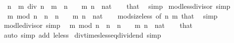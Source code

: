 \begin{isabellebody}
\ \ {\isachardoublequoteopen}n\ {\isacharasterisk}{\kern0pt}\ m\ div\ n\ {\isacharequal}{\kern0pt}\ m{\isachardoublequoteclose}\ \ {\isachardoublequoteopen}n\ {\isachargreater}{\kern0pt}\ {}{\isachardoublequoteclose}\ \ m\ n\ {\isacharcolon}{\kern0pt}{\isacharcolon}{\kern0pt}\ nat\isanewline
%
\isadelimproof
\ \ %
\endisadelimproof
%
\isatagproof
{}\isamarkupfalse%
\ that\ \isamarkupfalse%
\ simp%
\endisatagproof
{\isafoldproof}%
%
\isadelimproof
\isanewline
%
\endisadelimproof
\isanewline
{}\isamarkupfalse%
\ mod{\isacharunderscore}{\kern0pt}less{\isacharunderscore}{\kern0pt}divisor\ {\isacharbrackleft}{\kern0pt}simp{\isacharbrackright}{\kern0pt}{\isacharcolon}{\kern0pt}\isanewline
\ \ {\isachardoublequoteopen}m\ mod\ n\ {\isacharless}{\kern0pt}\ n{\isachardoublequoteclose}\ \ {\isachardoublequoteopen}n\ {\isachargreater}{\kern0pt}\ {}{\isachardoublequoteclose}\ \ m\ n\ {\isacharcolon}{\kern0pt}{\isacharcolon}{\kern0pt}\ nat\isanewline
%
\isadelimproof
\ \ %
\endisadelimproof
%
\isatagproof
{}\isamarkupfalse%
\ mod{\isacharunderscore}{\kern0pt}size{\isacharunderscore}{\kern0pt}less\ {\isacharbrackleft}{\kern0pt}of\ n\ m{\isacharbrackright}{\kern0pt}\ that\ \isamarkupfalse%
\ simp%
\endisatagproof
{\isafoldproof}%
%
\isadelimproof
\isanewline
%
\endisadelimproof
\isanewline
{}\isamarkupfalse%
\ mod{\isacharunderscore}{\kern0pt}le{\isacharunderscore}{\kern0pt}divisor\ {\isacharbrackleft}{\kern0pt}simp{\isacharbrackright}{\kern0pt}{\isacharcolon}{\kern0pt}\isanewline
\ \ {\isachardoublequoteopen}m\ mod\ n\ {\isasymle}\ n{\isachardoublequoteclose}\ \ {\isachardoublequoteopen}n\ {\isachargreater}{\kern0pt}\ {}{\isachardoublequoteclose}\ \ m\ n\ {\isacharcolon}{\kern0pt}{\isacharcolon}{\kern0pt}\ nat\isanewline
%
\isadelimproof
\ \ %
\endisadelimproof
%
\isatagproof
{}\isamarkupfalse%
\ that\ \isamarkupfalse%
\ {\isacharparenleft}{\kern0pt}auto\ simp\ add{\isacharcolon}{\kern0pt}\ le{\isacharunderscore}{\kern0pt}less{\isacharparenright}{\kern0pt}%
\endisatagproof
{\isafoldproof}%
%
\isadelimproof
\isanewline
%
\endisadelimproof
\isanewline
{}\isamarkupfalse%
\ div{\isacharunderscore}{\kern0pt}times{\isacharunderscore}{\kern0pt}less{\isacharunderscore}{\kern0pt}eq{\isacharunderscore}{\kern0pt}dividend\ {\isacharbrackleft}{\kern0pt}simp{\isacharbrackright}{\kern0pt}{\isacharcolon}{\kern0pt}\isanewline

\end{isabellebody}
